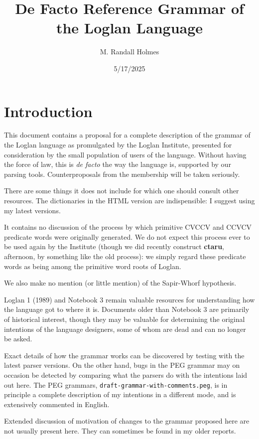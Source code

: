 \documentclass[12pt]{book}
\title{De Facto Reference Grammar of the Loglan Language}
\author{M. Randall Holmes}
\date{5/17/2025}
\begin{document}
\maketitle

\tableofcontents

\chapter{Introduction}

This document contains a proposal for a complete description of the grammar of the Loglan language as promulgated by the Loglan Institute, presented
for consideration by the small population of users of the language.  Without having the force of law, this is {\em de facto\/} the way the language is, supported by our parsing tools.   Counterproposals from the membership will be taken seriously.

There are some things it does not include for which one should consult other resources.  The dictionaries in the HTML version are indispensible:  I suggest using my latest versions.

It contains no discussion of the process by which primitive CVCCV and CCVCV predicate words were originally generated.  We do not expect this process ever to be used again by the Institute (though we did recently construct {\bf ctaru}, afternoon, by something like the old process):  we simply regard these predicate words as being among the primitive word roots of Loglan.

We also make no mention (or little mention) of the Sapir-Whorf hypothesis.

Loglan 1 (1989) and Notebook 3 remain valuable resources for understanding how the language got to where it is.   Documents older than Notebook 3 are primarily of historical interest, though they may be valuable for determining the original intentions of the language designers, some of whom are dead and can no longer be asked.

Exact details of how the grammar works can be discovered by testing with the latest parser versions.  On the other hand, bugs in the PEG grammar may on occasion be detected by comparing what the parsers do with the intentions laid out here.  The PEG grammars, {\tt draft-grammar-with-comments.peg}, is in principle a complete description of my intentions in a different mode, and is extensively commented in English.

Extended discussion of motivation of changes to the grammar proposed here are not usually present here.  They can sometimes be found in my older reports.
\end{document}
